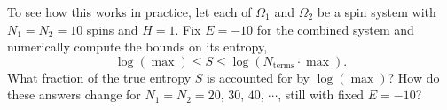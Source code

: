 \documentclass[12 pt]{article} %
\newcommand{\Om}{\ensuremath{\Omega} }
\begin{document}
To see how this works in practice, let each of $\Om_1$ and $\Om_2$ be a spin system with $N_1 = N_2 = 10$ spins and $H = 1$.
Fix $E = -10$ for the combined system and numerically compute the bounds on its entropy,
\begin{equation*}
  \log\left(\max\right) \leq S \leq \log\left(N_{\text{terms}} \cdot \max\right).
\end{equation*}
What fraction of the true entropy $S$ is accounted for by $\log\left(\max\right)$?
How do these answers change for $N_1 = N_2 = 20$, $30$, $40$, $\cdots$, still with fixed $E = -10$?
\end{document}
